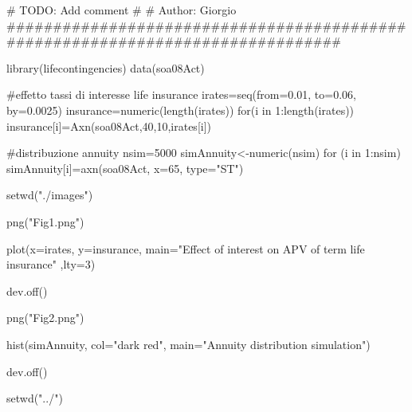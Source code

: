 # TODO: Add comment
# 
# Author: Giorgio
###############################################################################

library(lifecontingencies)
data(soa08Act)

#effetto tassi di interesse life insurance
irates=seq(from=0.01, to=0.06, by=0.0025)
insurance=numeric(length(irates))
for(i in 1:length(irates)) insurance[i]=Axn(soa08Act,40,10,irates[i])


#distribuzione annuity 
nsim=5000
simAnnuity<-numeric(nsim)
for (i in 1:nsim) simAnnuity[i]=axn(soa08Act, x=65, type="ST")

setwd("./images")

png("Fig1.png")

	plot(x=irates, y=insurance, 
			main="Effect of interest on APV of term life insurance"
	,lty=3)

dev.off()


png("Fig2.png")

hist(simAnnuity, col="dark red", main="Annuity distribution simulation")

dev.off()


setwd("../")
